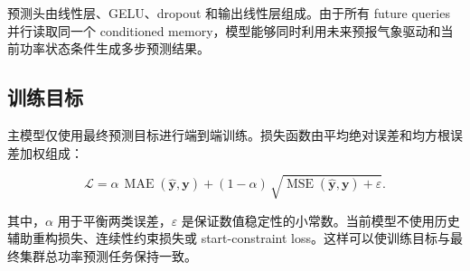 预测头由线性层、GELU、dropout 和输出线性层组成。由于所有 future queries 并行读取同一个 conditioned memory，模型能够同时利用未来预报气象驱动和当前功率状态条件生成多步预测结果。

\subsection{训练目标}

主模型仅使用最终预测目标进行端到端训练。损失函数由平均绝对误差和均方根误差加权组成：

\begin{equation}
\mathcal{L}=\alpha\,\operatorname{MAE}(\hat{\mathbf{y}},\mathbf{y})
+(1-\alpha)\,\sqrt{\operatorname{MSE}(\hat{\mathbf{y}},\mathbf{y})+\varepsilon}.
\end{equation}

其中，\(\alpha\) 用于平衡两类误差，\(\varepsilon\) 是保证数值稳定性的小常数。当前模型不使用历史辅助重构损失、连续性约束损失或 start-constraint loss。这样可以使训练目标与最终集群总功率预测任务保持一致。
